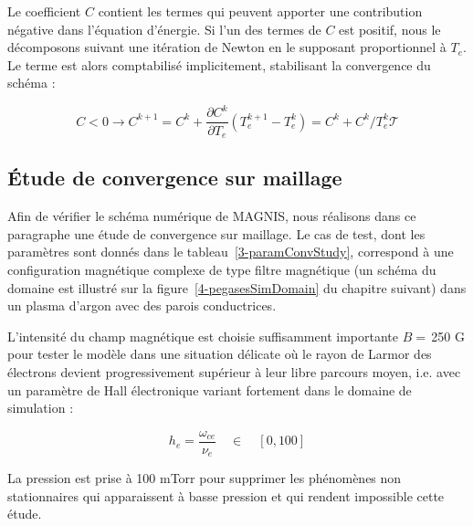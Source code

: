 \begin{refsection}
Le coefficient $C$ contient les termes qui peuvent apporter une contribution
négative dans l'équation d'énergie. Si l'un des
termes de $C$ est positif, nous le décomposons suivant une itération de
Newton en le supposant proportionnel à $T_e$. Le terme est alors comptabilisé
implicitement, stabilisant la convergence du schéma
\parencite{HagelaarImpl} :

\begin{equation*}
	C<0\rightarrow C^{k+1}=C^{k}+\frac{\partial C^k}{\partial
	T_e}(T_e^{k+1}-T_e^k)=C^{k}+ C^k/T_e^k\mathcal T
\end{equation*}

\subsection{Étude de convergence sur maillage} 
Afin de vérifier le schéma numérique de MAGNIS, nous réalisons dans ce
paragraphe une étude de convergence sur maillage. Le cas de test, dont les paramètres sont donnés dans le
tableau~\ref{3-paramConvStudy}, correspond à une configuration magnétique
complexe de type filtre magnétique (un schéma du domaine est illustré sur la
figure~\ref{4-pegasesSimDomain} du chapitre suivant) dans un plasma
d'argon avec des parois conductrices.

L'intensité du champ magnétique est choisie suffisamment importante $B=\,$250 G
pour tester le modèle dans une situation délicate où le rayon de Larmor des
électrons devient progressivement supérieur à leur libre parcours moyen, i.e.
avec un paramètre de Hall électronique variant fortement dans le domaine de
simulation :

\begin{equation}
h_e=\frac{\omega_{ce}}{\nu_e}\quad\in\quad \left[0,100\right]
\end{equation}

La pression est prise à 100 mTorr pour supprimer les phénomènes non stationnaires qui apparaissent à basse
pression et qui rendent impossible cette étude. 


\end{refsection}
